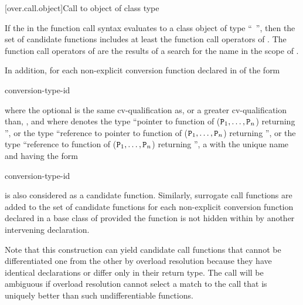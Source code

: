 [over.call.object]{Call to object of class type}

\pnum
If the  
in the function call syntax evaluates
to a class object of type ``\cv{}~'',
then the set of candidate functions
includes at least the function call operators of .
The function call operators of 
are the results of a search for the name 
in the scope of .

\pnum
In addition, for each non-explicit conversion function declared in  of the
form
\begin{ncsimplebnf}
 conversion-type-id \terminal{(\,)}     \terminal{;}
\end{ncsimplebnf}
where the optional
is the same cv-qualification as, or a greater cv-qualification than,
\cv{},
and where
denotes the type ``pointer to function
of ($\texttt{P}_1, \dotsc, \texttt{P}_n$) returning '',
or the type ``reference to pointer to function
of ($\texttt{P}_1, \dotsc, \texttt{P}_n$) returning '',
or the type
``reference to function of ($\texttt{P}_1, \dotsc, \texttt{P}_n$)
returning '', a  with the unique name
and having the form
\begin{ncbnf}
  \terminal{(} conversion-type-id \ %
 
\end{ncbnf}
is also considered as a candidate function.
Similarly, surrogate
call functions are added to the set of candidate functions for
each non-explicit conversion function declared in a base class of
provided the function is not hidden within
by another
intervening declaration.
\begin{footnote}
Note that this construction can yield
candidate call functions that cannot be
differentiated one from the other by overload resolution because they have
identical
declarations or differ only in their return type.
The call will be ambiguous
if overload
resolution cannot select a match to the call that is uniquely better than such
undifferentiable functions.
\end{footnote}

